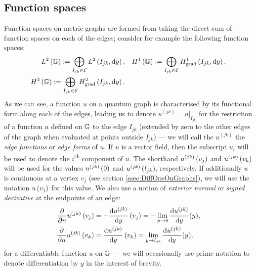 \subsection{Function spaces} \label{ssec:QG-FunctionSpaces}
Function spaces on metric graphs are formed from taking the direct sum of function spaces on each of the edges; consider for example the following function spaces: 
\begin{subequations} \label{eq:GraphFuncSpaces}
	\begin{align}
		L^2\left( \mathbb{G} \right) := \bigoplus_{I_{jk}\in \mathcal{E}} L^{2}\left( I_{jk},\mathrm{d} y \right),
		&\quad H^1\left( \mathbb{G} \right) := \bigoplus_{I_{jk}\in \mathcal{E}} H^1_\mathrm{grad}\left( I_{jk}, \mathrm{d}y \right), \\
		H^2\left( \mathbb{G} \right) := \bigoplus_{I_{jk}\in \mathcal{E}} H^2_\mathrm{grad}\left( I_{jk}, \mathrm{d} y \right). &
	\end{align}
\end{subequations}
As we can see, a function $u$ on a quantum graph is characterised by its functional form along each of the edges, leading us to denote $u^{(jk)} = u\vert_{I_{jk}}$ for the restriction of a function $u$ defined on $\mathbb{G}$ to the edge $I_{jk}$ (extended by zero to the other edges of the graph when evaluated at points outside $I_{jk}$) --- we will call the $u^{(jk)}$ the \emph{edge functions} or \emph{edge forms} of $u$.
If $u$ is a vector field, then the subscript $u_{i}$ will be used to denote the $i$\textsuperscript{th} component of $u$.
The shorthand $u^{(jk)}\left( v_j \right)$ and $u^{(jk)}\left( v_k \right)$ will be used for the values $u^{(jk)}\left( 0 \right)$ and $u^{(jk)}\left( l_{jk} \right)$, respectively.
If additionally $u$ is continuous at a vertex $v_j$ (see section \ref{ssec:DiffOpsOnGraphs}), we will use the notation $u\left( v_j \right)$ for this value.
We also use a notion of \emph{exterior normal} or \emph{signed derivative} at the endpoints of an edge:
\begin{subequations} \label{eq:SignedDerivConvention}
	\begin{align}
		\dfrac{\partial }{\partial n}u^{(jk)}\left( v_j \right) &= -\dfrac{\mathrm{d}u^{(jk)}}{\mathrm{d}y}\left( v_j \right) = -\lim_{y\rightarrow0}\dfrac{\mathrm{d}u^{(jk)}}{\mathrm{d}y}(y), \\
		\dfrac{\partial }{\partial n}u^{(jk)}\left( v_k \right) &= \dfrac{\mathrm{d}u^{(jk)}}{\mathrm{d}y}\left( v_k \right) = \lim_{y\rightarrow l_{jk}}\dfrac{\mathrm{d}u^{(jk)}}{\mathrm{d}y}(y),
	\end{align}
\end{subequations}
for a differentiable function $u$ on $\mathbb{G}$ --- we will occasionally use prime notation to denote differentiation by $y$ in the interest of brevity.
